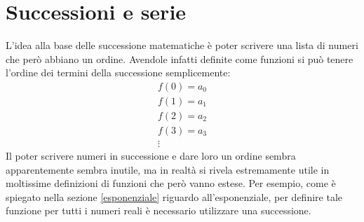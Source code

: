 \section{Successioni e serie} \label{successioni}
L'idea alla base delle successione matematiche è poter scrivere una lista di numeri che però abbiano un ordine. Avendole infatti definite come funzioni si può tenere l'ordine dei termini della successione semplicemente:
\begin{gather*}
    f(0) = a_0\\
    f(1) = a_1\\
    f(2) = a_2\\
    f(3) = a_3\\
    \vdots
\end{gather*}
Il poter scrivere numeri in successione e dare loro un ordine sembra apparentemente sembra inutile, ma in realtà si rivela estremamente utile in moltissime definizioni di funzioni che però vanno estese. Per esempio, come è spiegato nella sezione \ref{esponenziale} riguardo all'esponenziale, per definire tale funzione per tutti i numeri reali è necessario utilizzare una successione.\\


